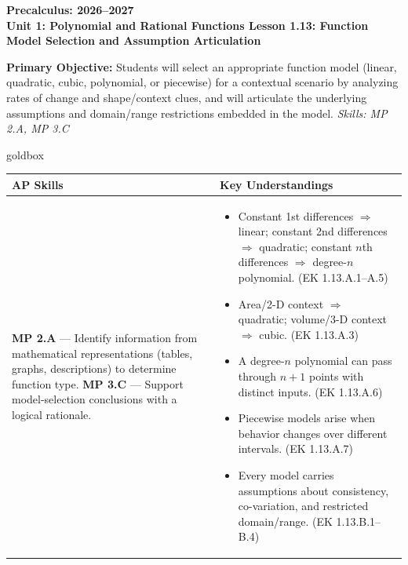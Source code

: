 \documentclass[10pt]{article}
\newcommand{\CourseName}{Precalculus}
\newcommand{\SchoolYear}{2026--2027}
\newcommand{\UnitNumberName}{Unit 1: Polynomial and Rational Functions \quad}
\newcommand{\LessonNumberName}{Lesson 1.13: Function Model Selection and Assumption Articulation}
\begin{document}
\begin{center}
    {\Large\bfseries \CourseName: \SchoolYear \\
    {\small\bfseries \UnitNumberName \LessonNumberName}}
\end{center}

\begin{tcolorbox}[colback=sky, colframe=navy, boxrule=0.9pt, arc=2mm,
    left=2mm, right=2mm, top=1.5mm, bottom=1.5mm]
    \textbf{Primary Objective:} Students will select an appropriate function model (linear,
    quadratic, cubic, polynomial, or piecewise) for a contextual scenario by analyzing rates
    of change and shape/context clues, and will articulate the underlying assumptions and
    domain/range restrictions embedded in the model.
    \hfill\textit{\small Skills: MP 2.A, MP 3.C}
\end{tcolorbox}

\renewcommand{\arraystretch}{1.6}
\begin{skillbox}{goldbox}
\begin{tabularx}{\linewidth}{@{}X X@{}}
\textbf{AP Skills} &
\textbf{Key Understandings} \\
\midrule
\textbf{MP 2.A} --- Identify information from mathematical representations (tables, graphs,
descriptions) to determine function type. \newline
\textbf{MP 3.C} --- Support model-selection conclusions with a logical rationale. &
\begin{itemize}[leftmargin=1.2em,itemsep=2pt,topsep=0pt]
  \item Constant 1st differences $\Rightarrow$ linear; constant 2nd differences $\Rightarrow$
        quadratic; constant $n$th differences $\Rightarrow$ degree-$n$ polynomial. (EK 1.13.A.1--A.5)
  \item Area/2-D context $\Rightarrow$ quadratic; volume/3-D context $\Rightarrow$ cubic. (EK 1.13.A.3)
  \item A degree-$n$ polynomial can pass through $n+1$ points with distinct inputs. (EK 1.13.A.6)
  \item Piecewise models arise when behavior changes over different intervals. (EK 1.13.A.7)
  \item Every model carries assumptions about consistency, co-variation, and restricted
        domain/range. (EK 1.13.B.1--B.4)
\end{itemize} \\
\end{tabularx}
\end{skillbox}
\end{document}
